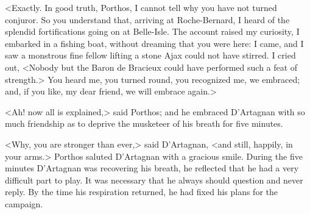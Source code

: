 <Exactly. In good truth, Porthos, I cannot tell why you have not turned conjuror. So you understand that, arriving at Roche-Bernard, I heard of the splendid fortifications going on at Belle-Isle. The account raised my curiosity, I embarked in a fishing boat, without dreaming that you were here: I came, and I saw a monstrous fine fellow lifting a stone Ajax could not have stirred. I cried out, <Nobody but the Baron de Bracieux could have performed such a feat of strength.> You heard me, you turned round, you recognized me, we embraced; and,  if you like, my dear friend, we will embrace again.>

<Ah! now all is explained,> said Porthos; and he embraced D'Artagnan with so much friendship as to deprive the musketeer of his breath for five minutes.

<Why, you are stronger than ever,> said D'Artagnan, <and still, happily, in your arms.> Porthos saluted D'Artagnan with a gracious smile. During the five minutes D'Artagnan was recovering his breath, he reflected that he had a very difficult part to play. It was necessary that he always should question and never reply. By the time his respiration returned, he had fixed his plans for the campaign. 